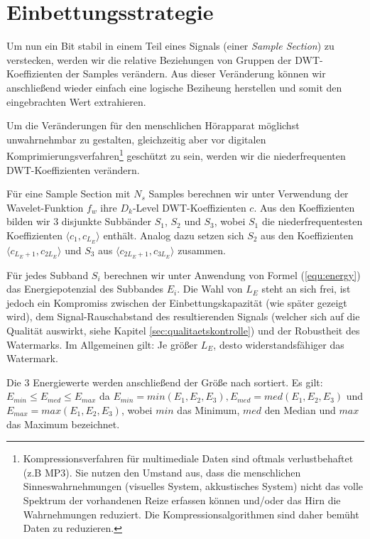 \section{Einbettungsstrategie}
\label{sec:embeddingstragety}

Um nun ein Bit stabil in einem Teil eines Signals (einer \textit{Sample Section}) zu verstecken, werden wir die relative Beziehungen von Gruppen der DWT-Koeffizienten der Samples verändern. Aus dieser Veränderung können wir anschließend wieder einfach eine logische Beziheung herstellen und somit den eingebrachten Wert extrahieren. 

Um die Veränderungen für den menschlichen Hörapparat möglichst unwahrnehmbar zu gestalten, gleichzeitig aber vor digitalen Komprimierungsverfahren\footnote{Kompressionsverfahren für multimediale Daten sind oftmals verlustbehaftet (z.B MP3). Sie nutzen den Umstand aus, dass die menschlichen Sinneswahrnehmungen (visuelles System, akkustisches System) nicht das volle Spektrum der vorhandenen Reize erfassen können und/oder das Hirn die Wahrnehmungen reduziert. Die Kompressionsalgorithmen sind daher bemüht \grqq{} Daten zu reduzieren.} geschützt zu sein, werden wir die niederfrequenten DWT-Koeffizienten verändern. 

Für eine Sample Section mit ${N}_{s}$  Samples berechnen wir unter Verwendung der Wavelet-Funktion ${f}_{w}$ ihre ${D}_{k}$-Level DWT-Koeffizienten $c$. Aus den Koeffizienten bilden wir 3 disjunkte Subbänder ${S}_{1}$, ${S}_{2}$ und ${S}_{3}$, wobei ${S}_{1}$ die niederfrequentesten Koeffizienten $\langle{c}_{1},{c}_{{L}_{E}}\rangle$ enthält. Analog dazu setzen sich ${S}_{2}$ aus den Koeffizienten $\langle{c}_{{L}_{E}+1},{c}_{2{L}_{E}}\rangle$ und ${S}_{3}$ aus $\langle{c}_{2{L}_{E}+1},{c}_{3{L}_{E}}\rangle$ zusammen. 

Für jedes Subband ${S}_{i}$ berechnen wir unter Anwendung von Formel (\ref{equ:energy}) das Energiepotenzial des Subbandes ${E}_{i}$. Die Wahl von ${L}_{E}$ steht an sich frei, ist jedoch ein Kompromiss zwischen der Einbettungskapazität (wie später gezeigt wird), dem Signal-Rauschabstand des resultierenden Signals (welcher sich auf die Qualität auswirkt\cite{xiang2007robust}, siehe Kapitel \ref{sec:qualitaetskontrolle}) und der Robustheit des Watermarks. Im Allgemeinen gilt: Je größer ${L}_{E}$, desto widerstandsfähiger das Watermark.

Die 3 Energiewerte werden anschließend der Größe nach sortiert. Es gilt: ${E}_{min}\leq{E}_{med}\leq{E}_{max}$ da ${E}_{min}=min({E}_{1}, {E}_{2}, {E}_{3}), {E}_{med}=med({E}_{1}, {E}_{2}, {E}_{3})$ und ${E}_{max}=max({E}_{1}, {E}_{2}, {E}_{3})$, wobei $min$ das Minimum, $med$ den Median und $max$ das Maximum bezeichnet. 


